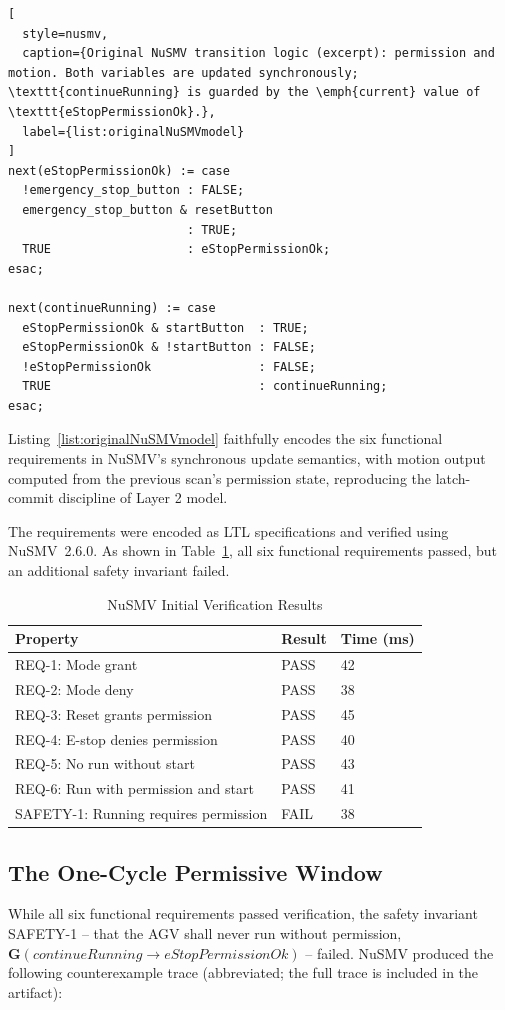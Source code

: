 \documentclass{ieeeaccess}
\theoremstyle{definition}
\newcommand{\G}{\mathbf{G}}
\begin{document}
\begin{lstlisting}[
  style=nusmv,
  caption={Original NuSMV transition logic (excerpt): permission and motion. Both variables are updated synchronously; \texttt{continueRunning} is guarded by the \emph{current} value of \texttt{eStopPermissionOk}.},
  label={list:originalNuSMVmodel}
]
next(eStopPermissionOk) := case
  !emergency_stop_button : FALSE;
  emergency_stop_button & resetButton
                         : TRUE;
  TRUE                   : eStopPermissionOk;
esac;

next(continueRunning) := case
  eStopPermissionOk & startButton  : TRUE;
  eStopPermissionOk & !startButton : FALSE;
  !eStopPermissionOk               : FALSE;
  TRUE                             : continueRunning;
esac;
\end{lstlisting}

Listing~\ref{list:originalNuSMVmodel} faithfully encodes the six functional requirements in NuSMV's synchronous update semantics, with motion output computed from the previous scan's permission state, reproducing the latch-commit discipline of Layer 2 model.

The requirements were encoded as LTL specifications and verified using NuSMV~2.6.0. As shown in Table~\ref{tab:InitialVerificationNuSMV}, all six functional requirements passed, but an additional safety invariant failed.

\begin{table}[t]
\centering
\caption{NuSMV Initial Verification Results}
\label{tab:InitialVerificationNuSMV}
\small
\begin{tabular}{lll}
\toprule
\textbf{Property} & \textbf{Result} & \textbf{Time (ms)}\\
\midrule
REQ-1: Mode grant & PASS & 42 \\
REQ-2: Mode deny & PASS & 38 \\
REQ-3: Reset grants permission & PASS & 45 \\
REQ-4: E-stop denies permission & PASS & 40 \\
REQ-5: No run without start & PASS & 43 \\
REQ-6: Run with permission and start & PASS & 41 \\
SAFETY-1: Running requires permission & FAIL & 38 \\
\bottomrule
\end{tabular}
\end{table}

\subsection{The One-Cycle Permissive Window}
\label{sec:window}
While all six functional requirements passed verification, the safety invariant SAFETY-1 -- that the AGV shall never run without permission, $\G(\mathit{continueRunning} \rightarrow \mathit{eStopPermissionOk})$ -- failed. NuSMV produced the following counterexample trace (abbreviated; the full trace is included in the artifact):
\end{document}
